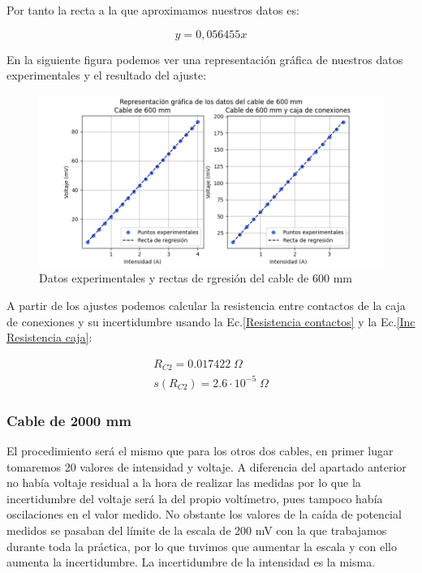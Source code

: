 \documentclass[a4paper,12pt,titlepage]{report}
\begin{document}
Por tanto la recta a la que aproximamos nuestros datos es:

\begin{equation}
    y = 0,056455x
\end{equation}

En la siguiente figura podemos ver una representación gráfica de nuestros datos experimentales y el resultado del ajuste:

\begin{figure}[h!]
    \centering
    \includegraphics[width=0.95\linewidth]{Images/plotCable2.png}
    \caption{Datos experimentales y rectas de rgresión del cable de 600 mm}
\end{figure}

\newpage

A partir de los ajustes podemos calcular la resistencia entre contactos de la caja de conexiones y su incertidumbre usando la Ec.\ref{Resistencia contactos} y la Ec.\ref{Inc Resistencia caja}:

\begin{equation}
    \begin{gathered}
        R_{C2} = 0.017422 \; \Omega\\
        s(R_{C2}) = 2.6 \cdot 10^{-5}\; \Omega
    \end{gathered}
\end{equation}



\subsubsection{Cable de 2000 mm}

El procedimiento será el mismo que para los otros dos cables, en primer lugar tomaremos 20 valores de intensidad y voltaje. A diferencia del apartado anterior no había voltaje residual a la hora de realizar las medidas por lo que la incertidumbre del voltaje será la del propio voltímetro, pues tampoco había oscilaciones en el valor medido. No obstante los valores de la caída de potencial medidos se pasaban del límite de la escala de 200 mV con la que trabajamos durante toda la práctica, por lo que tuvimos que aumentar la escala y con ello aumenta la incertidumbre. La incertidumbre de la intensidad es la misma.
\end{document}
